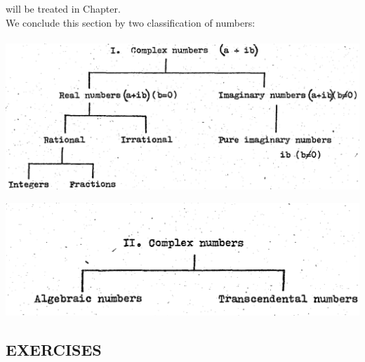 \documentclass[11pt]{amsbook}
\begin{document}
will be treated in Chapter.\\

We conclude this section by two classification of numbers:\\\\

















	\includegraphics[width=1\textwidth]{images/b1p1-015-fig01}

	\includegraphics[width=1\textwidth]{images/b1p1-015-fig02}\\

\subsection{EXERCISES}
\end{document}
